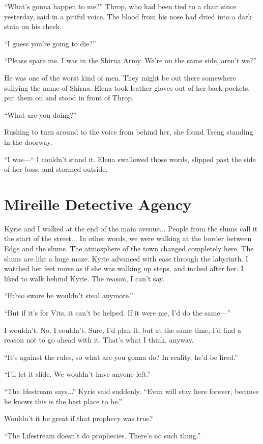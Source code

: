 \documentclass[oneside]{book}
\begin{document}
“What’s gonna happen to me?” Throp, who had been tied to a chair since yesterday, said in a pitiful voice. The blood from his nose had dried into a dark stain on his cheek.

“I guess you’re going to die?”

“Please spare me. I was in the Shirna Army. We’re on the same side, aren’t we?”

He was one of the worst kind of men. They might be out there somewhere sullying the name of Shirna. Elena took leather gloves out of her back pockets, put them on and stood in front of Throp.

“What are you doing?”

Rushing to turn around to the voice from behind her, she found Tseng standing in the doorway.

“I was—“ I couldn’t stand it. Elena swallowed those words, slipped past the side of her boss, and stormed outside.

\chapter{Mireille Detective Agency}
Kyrie and I walked at the end of the main avenue... People from the slums call it the start of the street... In other words, we were walking at the border between Edge and the slums. The atmosphere of the town changed completely here. The slums are like a huge maze. Kyrie advanced with ease through the labyrinth. I watched her feet move as if she was walking up steps, and inched after her. I liked to walk behind Kyrie. The reason, I can’t say.

“Fabio swore he wouldn’t steal anymore.”

“But if it’s for Vits, it can’t be helped. If it were me, I’d do the same—”

I wouldn’t. No. I couldn’t. Sure, I’d plan it, but at the same time, I’d find a reason not to go ahead with it. That’s what I think, anyway.

“It’s against the rules, so what are you gonna do? In reality, he’d be fired.”

“I’ll let it slide. We wouldn’t have anyone left.”

“The lifestream says...” Kyrie said suddenly. “Evan will stay here forever, because he knows this is the best place to be.”

Wouldn’t it be great if that prophecy was true?

“The Lifestream doesn’t do prophecies. There’s no such thing.”
\end{document}
